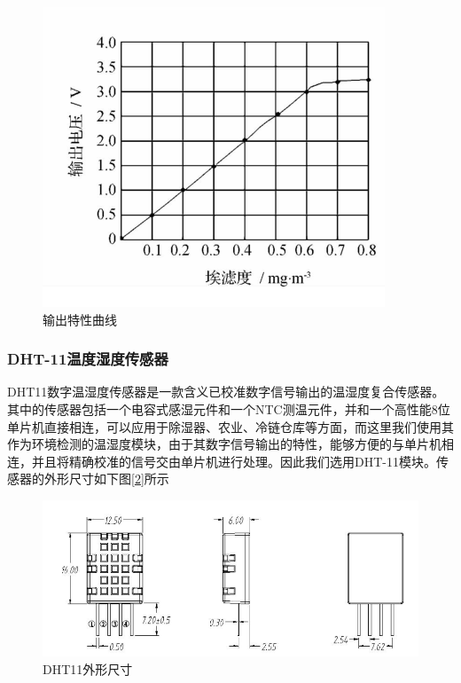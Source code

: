 \documentclass[a4paper, 11pt]{article} %
\begin{document}
\begin{figure}[H]
  \centering
  \includegraphics[scale = 0.65 ]{1-6.png}
  \caption{输出特性曲线}
  \label{img7} 
\end{figure}



\subsubsection{DHT-11温度湿度传感器}
\par{} DHT11数字温湿度传感器是一款含义已校准数字信号输出的温湿度复合传感器。其中的传感器包括一个电容式感湿元件和一个NTC测温元件，并和一个高性能8位单片机直接相连，可以应用于除湿器、农业、冷链仓库等方面，而这里我们使用其作为环境检测的温湿度模块，由于其数字信号输出的特性，能够方便的与单片机相连，并且将精确校准的信号交由单片机进行处理。因此我们选用DHT-11模块。传感器的外形尺寸如下图[\ref{img8}]所示
\begin{figure}[H]
  \centering
  \includegraphics[scale = 0.58 ]{1-7.png}
  \caption{DHT11外形尺寸}
  \label{img8} 
\end{figure}
\end{document}
